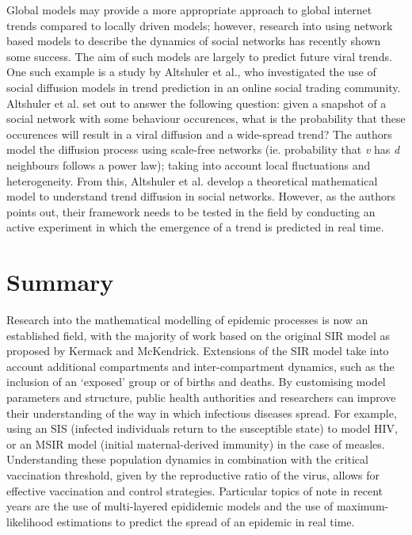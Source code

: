 Global models may provide a more appropriate approach to global
internet trends compared to locally driven models; however, research
into using network based models to describe the dynamics of social
networks has recently shown some success. The aim of such models are
largely to predict future viral trends. One such example is a study by
Altshuler et al., who investigated the use of social diffusion models
in trend prediction in an online social trading
community.\cite{altshuler} Altshuler et al. set out to answer the
following question: given a snapshot of a social network with some
behaviour occurences, what is the probability that these occurences
will result in a viral diffusion and a wide-spread trend? The authors
model the diffusion process using scale-free networks (ie. probability
that \emph{v} has \emph{d} neighbours follows a power law); taking
into account local fluctuations and heterogeneity. From this,
Altshuler et al. develop a theoretical mathematical model to
understand trend diffusion in social networks. However, as the authors
points out, their framework needs to be tested in the field by
conducting an active experiment in which the emergence of a trend is
predicted in real time.

\section{Summary}
Research into the mathematical modelling of epidemic processes is now
an established field, with the majority of work based on the original
SIR model as proposed by Kermack and McKendrick.\cite{kermack}
Extensions of the SIR model take into account additional compartments
and inter-compartment dynamics, such as the inclusion of an `exposed'
group or of births and deaths. By customising model parameters and
structure, public health authorities and researchers can improve their
understanding of the way in which infectious diseases spread. For
example, using an SIS (infected individuals return to the susceptible
state) to model HIV, or an MSIR model (initial maternal-derived
immunity) in the case of measles.\cite{vynnycky} Understanding these
population dynamics in combination with the critical vaccination
threshold, given by the reproductive ratio of the virus, allows for
effective vaccination and control strategies. Particular topics of
note in recent years are the use of multi-layered epididemic models
and the use of maximum-likelihood estimations to predict the spread of
an epidemic in real time. \cite{tizzoni, gefm, white, hall, nishiura}

